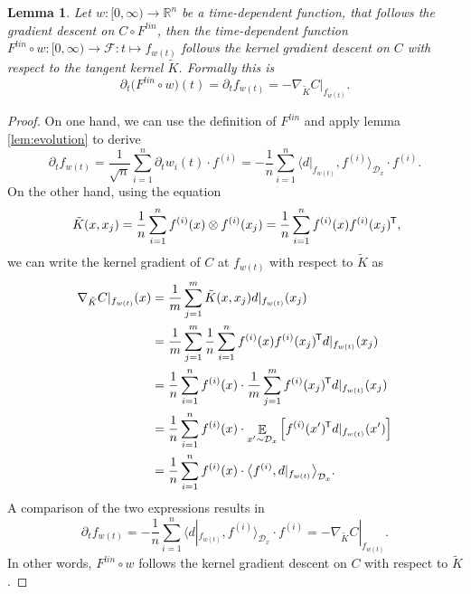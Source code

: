 \documentclass[11pt, a4paper]{article}
\newtheorem{lemma}[theorem]{Lemma}
\newcommand{\R}{\mathbb{R}}
\newcommand{\D}{\mathcal{D}}
\newcommand{\F}{\mathcal{F}}
\newcommand*{\tr}{^{\mkern-1.5mu\mathsf{T}}}
\DeclareMathOperator*{\E}{\mathbb{E}}
\begin{document}
\begin{lemma} \label{lem:tk}
Let $w: [0, \infty) \to \R^n$ be a time-dependent function, that follows the gradient descent on $C \circ F^\textit{lin}$, then the time-dependent function $F^\textit{lin} \circ w : [0, \infty) \to \F : t \mapsto f_{w(t)}$ follows the kernel gradient descent on $C$ with respect to the tangent kernel $\tilde{K}$. Formally this is
\[ \partial_t \big (F^\textit{lin} \circ w \big )(t) = \partial_tf_{w(t)} = -\nabla_{\tilde{K}}C|_{f_{w(t)}}. \]
\end{lemma}

\begin{proof}
On one hand, we can use the definition of $F^\textit{lin}$ and apply lemma \ref{lem:evolution} to derive
\[ \partial_tf_{w(t)} = \frac{1}{\sqrt{n}} \sum_{i=1}^{n} \partial_t w_i(t) \cdot f^{(i)} = - \frac{1}{n} \sum_{i=1}^{n} \big \langle d|_{f_{w(t)}}, f^{(i)} \big \rangle_{\D_x} \cdot f^{(i)}. \]
On the other hand, using the equation
\[ \tilde{K}(x,x_j) = \frac{1}{n} \sum_{i=1}^{n}f^{(i)}(x) \otimes f^{(i)}(x_j) = \frac{1}{n} \sum_{i=1}^{n}f^{(i)}(x) f^{(i)}(x_j) \tr, \]
we can write the kernel gradient of $C$ at $f_{w(t)}$ with respect to $\tilde{K}$ as
\[ \begin{split}
\nabla_{\tilde{K}} C|_{f_{w(t)}}(x)
&= \frac{1}{m} \sum_{j=1}^{m} \tilde{K}(x,x_j)d|_{f_{w(t)}}(x_j) \\\
&= \frac{1}{m} \sum_{j=1}^{m} \frac{1}{n} \sum_{i=1}^{n}f^{(i)}(x) f^{(i)}(x_j) \tr d|_{f_{w(t)}}(x_j) \\\
&= \frac{1}{n} \sum_{i=1}^{n} f^{(i)}(x) \cdot \frac{1}{m} \sum_{j=1}^{m} f^{(i)}(x_j) \tr  d|_{f_{w(t)}}(x_j) \\\
&= \frac{1}{n} \sum_{i=1}^{n} f^{(i)}(x) \cdot \E_{x' \sim \D_x} \Big [ f^{(i)}(x')\tr  d|_{f_{w(t)}}(x') \Big ] \\\
&= \frac{1}{n} \sum_{i=1}^{n} f^{(i)}(x) \cdot \big \langle f^{(i)}, d|_{f_{w(t)}} \big \rangle_{\D_x}.
\end{split} \]
A comparison of the two expressions results in
\[ \partial_tf_{w(t)} = - \frac{1}{n} \sum_{i=1}^{n} \big \langle d|_{f_{w(t)}}, f^{(i)} \big \rangle_{\D_x} \cdot f^{(i)} = -\nabla_{\tilde{K}} C|_{f_{w(t)}}. \]
In other words, $F^\textit{lin} \circ w$ follows the kernel gradient descent on $C$ with respect to $\tilde{K}$.
\end{proof}
\end{document}
